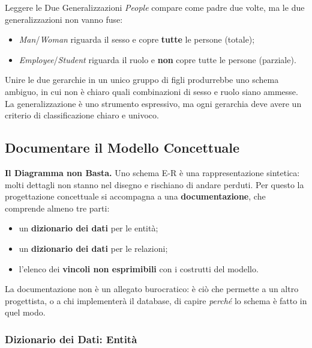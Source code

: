\documentclass[12pt]{extarticle}
\begin{document}

\begin{cbox}{Leggere le Due Generalizzazioni}
\noindent \textit{People} compare come padre due volte, ma le due generalizzazioni non vanno fuse:
\begin{itemize}
    \item \textit{Man}/\textit{Woman} riguarda il sesso e copre \textbf{tutte} le persone (totale);
    \item \textit{Employee}/\textit{Student} riguarda il ruolo e \textbf{non} copre tutte le persone (parziale).
\end{itemize}
Unire le due gerarchie in un unico gruppo di figli produrrebbe uno schema ambiguo, in cui non è chiaro quali combinazioni di sesso e ruolo siano ammesse. La generalizzazione è uno strumento espressivo, ma ogni gerarchia deve avere un criterio di classificazione chiaro e univoco.
\end{cbox}

\subsection{Documentare il Modello Concettuale}

\noindent \textbf{Il Diagramma non Basta.} Uno schema E-R è una rappresentazione sintetica: molti dettagli non stanno nel disegno e rischiano di andare perduti. Per questo la progettazione concettuale si accompagna a una \textbf{documentazione}, che comprende almeno tre parti:
\begin{itemize}
    \item un \textbf{dizionario dei dati} per le entità;
    \item un \textbf{dizionario dei dati} per le relazioni;
    \item l'elenco dei \textbf{vincoli non esprimibili} con i costrutti del modello.
\end{itemize}
La documentazione non è un allegato burocratico: è ciò che permette a un altro progettista, o a chi implementerà il database, di capire \textit{perché} lo schema è fatto in quel modo.

\subsubsection{Dizionario dei Dati: Entità}
\end{document}
